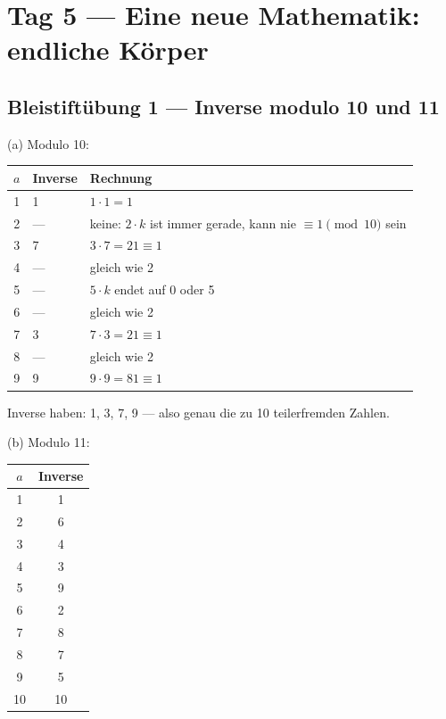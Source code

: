 \section{Tag 5 — Eine neue Mathematik: endliche Körper}

\subsection*{Bleistiftübung 1 — Inverse modulo 10 und 11}

(a) Modulo 10:

\begin{center}
\begin{tabular}{cll}
  \toprule
  $a$ & Inverse & Rechnung \\
  \midrule
  1 & 1   & $1 \cdot 1 = 1$ \\
  2 & --- & keine: $2 \cdot k$ ist immer gerade, kann nie $\equiv 1 \pmod{10}$ sein \\
  3 & 7   & $3 \cdot 7 = 21 \equiv 1$ \\
  4 & --- & gleich wie 2 \\
  5 & --- & $5 \cdot k$ endet auf 0 oder 5 \\
  6 & --- & gleich wie 2 \\
  7 & 3   & $7 \cdot 3 = 21 \equiv 1$ \\
  8 & --- & gleich wie 2 \\
  9 & 9   & $9 \cdot 9 = 81 \equiv 1$ \\
  \bottomrule
\end{tabular}
\end{center}

Inverse haben: 1, 3, 7, 9 — also genau die zu 10 teilerfremden
Zahlen.

(b) Modulo 11:

\begin{center}
\begin{tabular}{cc}
  \toprule
  $a$ & Inverse \\
  \midrule
  1  & 1  \\
  2  & 6  \\
  3  & 4  \\
  4  & 3  \\
  5  & 9  \\
  6  & 2  \\
  7  & 8  \\
  8  & 7  \\
  9  & 5  \\
  10 & 10 \\
  \bottomrule
\end{tabular}
\end{center}

